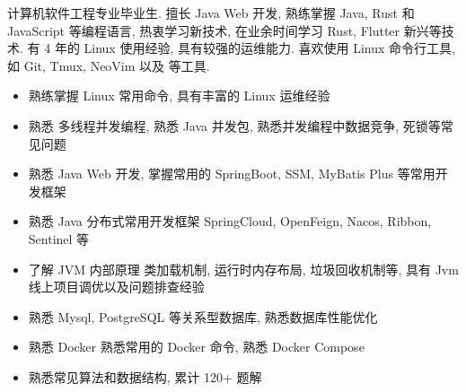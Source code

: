 \documentclass[zh]{resume}
\begin{document}
\makeheader

{\onehalfspacing\hspace{2em}%
	计算机软件工程专业毕业生. 擅长 Java Web 开发,
	熟练掌握 Java, Rust 和 JavaScript 等编程语言, 热衷学习新技术, 在业余时间学习 Rust, Flutter 新兴等技术.
  有 4 年的 Linux 使用经验, 具有较强的运维能力. 喜欢使用 Linux 命令行工具, 如 Git, Tmux, NeoVim
	以及  等工具.
	\par}

\begin{competences}
\end{competences}


\begin{itemize}
  \item 熟练掌握 Linux 常用命令, 具有丰富的 Linux 运维经验
	\item 熟悉 多线程并发编程, 熟悉 Java 并发包, 熟悉并发编程中数据竞争, 死锁等常见问题
	\item 熟悉 Java Web 开发, 掌握常用的 SpringBoot, SSM, MyBatis Plus 等常用开发框架
	\item 熟悉 Java 分布式常用开发框架 SpringCloud, OpenFeign, Nacos, Ribbon, Sentinel 等
	\item 了解 JVM 内部原理 类加载机制, 运行时内存布局, 垃圾回收机制等, 具有 Jvm 线上项目调优以及问题排查经验
  \item 熟悉 Mysql, PostgreSQL 等关系型数据库, 熟悉数据库性能优化
	\item 熟悉 Docker 熟悉常用的 Docker 命令, 熟悉 Docker Compose
	\item 熟悉常见算法和数据结构,  累计 120+ 题解
\end{itemize}
\end{document}
